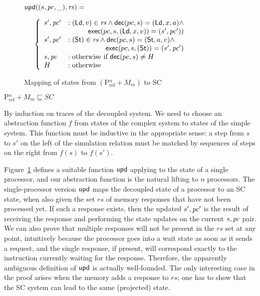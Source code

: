 \begin{figure}[h]
\begin{boxedminipage}{\columnwidth}
\small
$\mathsf{upd}((s, \mathit{pc}, \_), \mathit{rs}) =$

\begin{math}
\;\;\;\;\;\left\{
\begin{array}{ll}
s', \pc' &: (\ld, v) \in \mathit{rs} \wedge \dec(pc, s) = (\ld, x, a) \wedge\\
\multicolumn{2}{r}{\exec(pc, s, (\ld, x, v)) = (s',\pc'))}\\
s', \pc' &: (\st) \in \mathit{rs} \wedge \dec(pc, s) = (\st, a, v) \wedge\\
\multicolumn{2}{r}{\exec(pc, s, (\st)) = (s',\pc')}\\
s, \pc &: \text{otherwise if } \dec(pc,s) \neq H\\
H &: \text{otherwise}
\end{array}
\right.
\end{math}
\end{boxedminipage}
\caption{Mapping of states from $(\text{P$^n_\text{ref}$} + M_m)$ to SC}
\label{smap}
\end{figure}

\begin{theorem}
$\text{P$^n_{\text{ref}}$} + M_m \sqsubseteq SC$\label{scthm}
\end{theorem}
\begin{prf}
By induction on traces of the decoupled system.  We need to choose an
abstraction function $f$ from states of the complex system to states of
the simple system.  This function must be inductive in the
appropriate sense: a step from $s$ to $s'$ on the left of the
simulation relation must be matched by sequences of steps on the right
from $f(s)$ to $f(s')$.

Figure~\ref{smap} defines a suitable function $\mathsf{upd}$ applying to the
state of a single processor, and our abstraction function is the
natural lifting to $n$ processors.
The single-processor version $\mathsf{upd}$ maps
the decoupled state of a processor to an SC state, when also given the
set $rs$ of memory responses that have not been processed yet. If such a
response exists, then the updated $s', \mathit{pc}'$ is the result of
receiving the response and performing the state updates on the current $s,
\mathit{pc}$ pair.  We can also prove that multiple responses will not be present in
the $rs$ set at any point, intuitively because the processor goes into a wait
state as soon as it sends a request, and the single response, if present, will
correspond exactly to the instruction currently waiting for the response.
Therefore, the apparently ambiguous definition of $\mathsf{upd}$ is actually
well-founded.  The only interesting case in the proof arises when the memory adds a
response to $rs$; one has to show that the SC system can lead to the same
(projected) state.
\end{prf}

